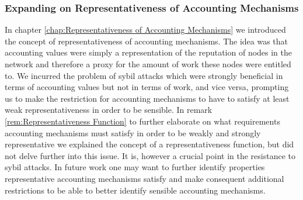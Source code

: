 \subsubsection*{Expanding on Representativeness of Accounting Mechanisms}
\label{subsubsec:Expanding on Representativeness of Accounting Mechanisms}
\noindent{}In chapter \ref{chap:Representativeness of Accounting Mechanisms} we introduced the concept of representativeness of accounting mechanisms. The idea was that accounting values were simply a representation of the reputation of nodes in the network and therefore a proxy for the amount of work these nodes were entitled to. We incurred the problem of sybil attacks which were strongly beneficial in terms of accounting values but not in terms of work, and vice versa, prompting us to make the restriction for accounting mechanisms to have to satisfy at least weak representativeness in order to be sensible. In remark \ref{rem:Representativeness Function} to further elaborate on what requirements accounting mechanisms must satisfy in order to be weakly and strongly representative we explained the concept of a representativeness function, but did not delve further into this issue. It is, however a crucial point in the resistance to sybil attacks. In future work one may want to further identify properties representative accounting mechanisms satisfy and make consequent additional restrictions to be able to better identify sensible accounting mechanisms.\vspace{1em}\\ 

